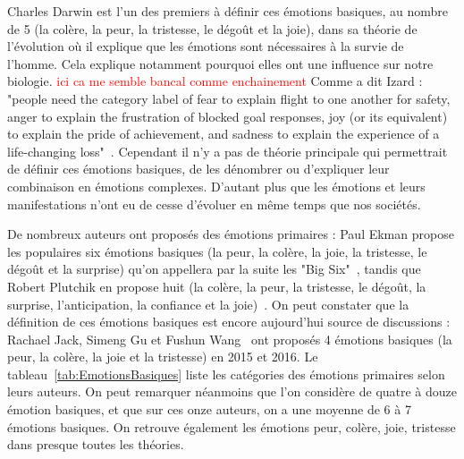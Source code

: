 Charles Darwin est l'un des premiers à définir ces émotions basiques, au nombre de 5 (la colère, la peur, la tristesse, le dégoût et la joie), dans sa théorie de l'évolution où il explique que les émotions sont nécessaires à la survie de l'homme. Cela explique notamment pourquoi elles ont une influence sur notre biologie.
\textcolor{red}{ici ca me semble bancal comme enchainement}
Comme a dit Izard : "people need the category label of fear to explain flight to one another for safety, anger to explain the frustration of blocked goal responses, joy (or its equivalent) to explain the pride of achievement, and sadness to explain the experience of a life-changing loss"~\cite{Izard2007}.
Cependant il n'y a pas de théorie principale qui permettrait de définir ces émotions basiques, de les dénombrer ou d'expliquer leur combinaison en émotions complexes. D'autant plus que les émotions et leurs manifestations n'ont eu de cesse d'évoluer en même temps que nos sociétés.



De nombreux auteurs ont proposés des émotions primaires : Paul Ekman propose les populaires six émotions basiques (la peur, la colère, la joie, la tristesse, le dégoût et la surprise) qu'on appellera par la suite les "Big Six"~\cite{Ekman1999}, tandis que Robert Plutchik en propose huit (la colère, la peur, la tristesse, le dégoût, la surprise, l'anticipation, la confiance et la joie)~\cite{Plutchik1980}. On peut constater que la définition de ces émotions basiques est encore aujourd'hui source de discussions : Rachael Jack, Simeng Gu et Fushun Wang~\cite{Jack2016,Gu2015,Wang2016} ont proposés 4 émotions basiques (la peur, la colère, la joie et la tristesse) en 2015 et 2016. Le tableau~\ref{tab:EmotionsBasiques} liste les catégories des émotions primaires selon leurs auteurs. On peut remarquer néanmoins que l'on considère de quatre à douze émotion basiques, et que sur ces onze auteurs, on a une moyenne de 6 à 7 émotions basiques. On retrouve également les émotions peur, colère, joie, tristesse dans presque toutes les théories.

